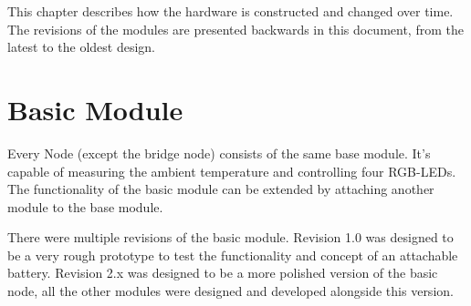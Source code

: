This chapter describes how the hardware is constructed and changed over time.
The revisions of the modules are presented backwards in this document, from
the latest to the oldest design. 

\section{Basic Module} \label{sec:basic_module}
    Every Node (except the bridge node) consists of the same base module. It's
    capable of measuring the ambient temperature and controlling four RGB-LEDs.
    The functionality of the basic module can be extended by attaching another
    module to the base module. 

    There were multiple revisions of the basic module. Revision 1.0 was designed to
    be a very rough prototype to test the functionality and concept of an attachable 
    battery. Revision 2.x was designed to be a more polished version of the basic node, 
    all the other modules were designed and developed alongside this version.

    
    
    
    

